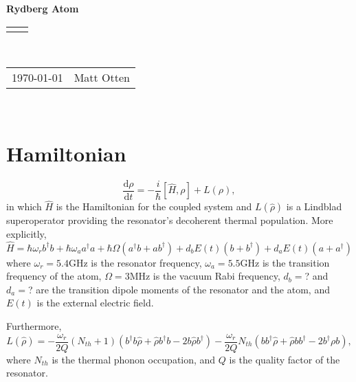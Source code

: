 \documentclass[12pt]{article}
\renewcommand{\title}[1]{\textbf{#1}\\}
\renewcommand{\line}{\begin{tabularx}{\textwidth}{X>{\raggedleft}X}\hline\\\end{tabularx}\\[-0.5cm]}
\newcommand{\leftright}[2]{\begin{tabularx}{\textwidth}{X>{\raggedleft}X}#1%
& #2\\\end{tabularx}\\[-0.5cm]}
\begin{document}
\title{Rydberg Atom}
\line
\leftright{\today}{Matt Otten} %

\section{Hamiltonian}

\begin{equation}
\frac{\mathrm{d} {\rho}}{\mathrm{d} t}
= -\frac{i}{\hbar} [ \hat{H}, {\rho} ] +
L({\rho}),
\end{equation}
in which $ \hat{H} $ is the Hamiltonian for the coupled system
and $ L(\hat{\rho}) $ is a Lindblad superoperator providing 
the resonator's decoherent thermal population. More explicitly,
\begin{equation}\label{5_ham_terms}
\hat{H} = \hbar \omega_r b^\dagger b + \hbar \omega_a a^\dagger a
+ \hbar \Omega (a^\dagger b + a b^\dagger) + d_b E(t) (b + b^\dagger)
+ d_a E(t) (a+a^\dagger)
\end{equation}
where $\omega_r = 5.4$GHz is the resonator frequency,
$\omega_a = 5.5$GHz is the transition frequency of the atom,
$\Omega = 3$MHz is the vacuum Rabi frequency,
$d_b = $? and $d_a = $? are the transition dipole moments
of the resonator and the atom, and  $ E(t) $ is the external electric field.

Furthermore,
\begin{equation}\label{5_lindblad_q}
L(\hat{\rho}) =
- \frac{\omega_r}{2Q}(N_{th} + 1)
(b^{\dagger} b \hat{\rho}
+ \hat{\rho} b^{\dagger} b
- 2 b \hat{\rho} b^{\dagger})
- \frac{\omega_r}{2Q}N_{th}
(b b^{\dagger} \hat{\rho}
+ \hat{\rho} b b^{\dagger}
- 2 b^\dagger \rho b),
\end{equation}
where $N_{th}$ is the thermal phonon occupation, and $Q$ is the quality factor of the 
resonator.
\end{document}

